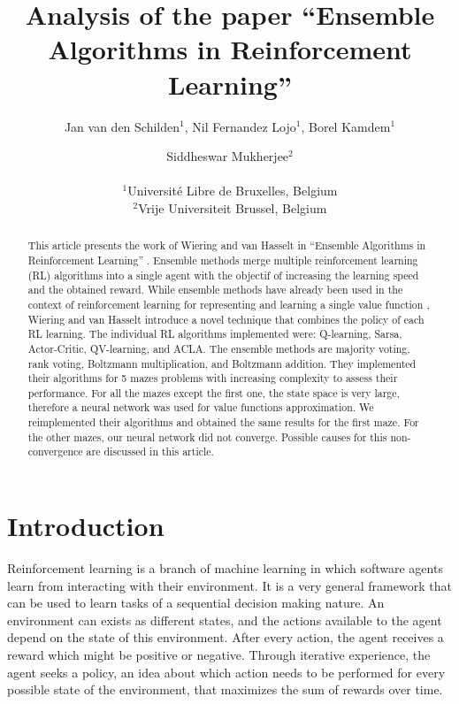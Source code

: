 \documentclass[letterpaper]{article}
\title{Analysis of the paper ``Ensemble Algorithms in Reinforcement Learning''}
\author{Jan van den Schilden$^{1}$, Nil Fernandez Lojo$^{1}$, Borel Kamdem$^{1}$ \and Siddheswar Mukherjee$^2$ \\
\mbox{}\\
$^1$Université Libre de Bruxelles, Belgium\\
$^2$Vrije Universiteit Brussel, Belgium }
\begin{document}
\maketitle

\begin{abstract}
This article presents the work of Wiering and van Hasselt in ``Ensemble
Algorithms in Reinforcement Learning'' \cite{wiering2008}. Ensemble methods
merge multiple reinforcement learning (RL) algorithms into a single
agent with the objectif of increasing the learning speed and the
obtained reward. While ensemble methods have already been used in the
context of reinforcement learning for representing and learning a single
value function \cite{singh1992, tham1995, sun1999}, Wiering and van Hasselt
introduce a novel technique that combines the policy of each RL
learning. The individual RL algorithms implemented were: Q-learning,
Sarsa, Actor-Critic, QV-learning, and ACLA. The ensemble methods are
majority voting, rank voting, Boltzmann multiplication, and Boltzmann
addition. They implemented their algorithms for 5 mazes problems with
increasing complexity to assess their performance. For all the mazes
except the first one, the state space is very large, therefore a neural
network was used for value functions approximation. We reimplemented
their algorithms and obtained the same results for the first maze. For
the other mazes, our neural network did not converge. Possible causes
for this non-convergence are discussed in this article.
\end{abstract}

\section{Introduction}\label{introduction}

Reinforcement learning is a branch of machine learning in which software
agents learn from interacting with their environment. It is a very
general framework that can be used to learn tasks of a sequential
decision making nature. An environment can exists as different states,
and the actions available to the agent depend on the state of this
environment. After every action, the agent receives a reward which might
be positive or negative. Through iterative experience, the agent seeks a
policy, an idea about which action needs to be performed for every
possible state of the environment, that maximizes the sum of rewards
over time.
\end{document}
